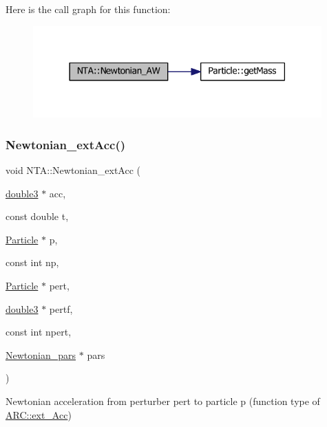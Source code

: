 Here is the call graph for this function\+:
\nopagebreak
\begin{figure}[H]
\begin{center}
\leavevmode
\includegraphics[width=314pt]{namespaceNTA_aad37ae368f0a920088e180a73187685a_cgraph}
\end{center}
\end{figure}
\hypertarget{namespaceNTA_a5b1a4fcaa09041cdf89a6b3122815c56}{}\label{namespaceNTA_a5b1a4fcaa09041cdf89a6b3122815c56} 
\subsubsection{\texorpdfstring{Newtonian\+\_\+ext\+Acc()}{Newtonian\_extAcc()}}
{\footnotesize\ttfamily void N\+T\+A\+::\+Newtonian\+\_\+ext\+Acc (\begin{DoxyParamCaption}\item[{\hyperlink{namespaceNTA_a19ccaac066849b26305dbbbee129fa0e}{double3} $\ast$}]{acc,  }\item[{const double}]{t,  }\item[{\hyperlink{classParticle}{Particle} $\ast$}]{p,  }\item[{const int}]{np,  }\item[{\hyperlink{classParticle}{Particle} $\ast$}]{pert,  }\item[{\hyperlink{namespaceNTA_a19ccaac066849b26305dbbbee129fa0e}{double3} $\ast$}]{pertf,  }\item[{const int}]{npert,  }\item[{\hyperlink{classNTA_1_1Newtonian__pars}{Newtonian\+\_\+pars} $\ast$}]{pars }\end{DoxyParamCaption})}



Newtonian acceleration from perturber pert to particle p (function type of \hyperlink{namespaceARC_a7aeda3b3bd009af7ac964748834dd312}{A\+R\+C\+::ext\+\_\+\+Acc}) 


